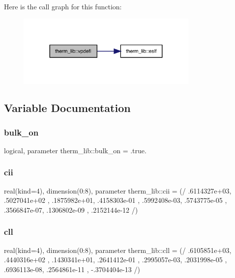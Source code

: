 Here is the call graph for this function\+:
\nopagebreak
\begin{figure}[H]
\begin{center}
\leavevmode
\includegraphics[width=251pt]{namespacetherm__lib_a6f84a6e1d410eb7f89dd59a9f6a13f3b_cgraph}
\end{center}
\end{figure}


\subsection{Variable Documentation}
\mbox{\label{namespacetherm__lib_a74e34c886f54fe2ca038c4f301d31beb}} 
\subsubsection{\texorpdfstring{bulk\+\_\+on}{bulk\_on}}
{\footnotesize\ttfamily logical, parameter therm\+\_\+lib\+::bulk\+\_\+on = .true.}

\mbox{\label{namespacetherm__lib_a80e96618552a9428c5819e0f9fcbc242}} 
\subsubsection{\texorpdfstring{cii}{cii}}
{\footnotesize\ttfamily real(kind=4), dimension(0\+:8), parameter therm\+\_\+lib\+::cii = (/ .\+6114327e+03, .\+5027041e+02 , .\+1875982e+01, .\+4158303e-\/01 , .\+5992408e-\/03, .\+5743775e-\/05 , .\+3566847e-\/07, .\+1306802e-\/09 , .\+2152144e-\/12 /)}

\mbox{\label{namespacetherm__lib_a0fd2184c73856d805e115f4a13068150}} 
\subsubsection{\texorpdfstring{cll}{cll}}
{\footnotesize\ttfamily real(kind=4), dimension(0\+:8), parameter therm\+\_\+lib\+::cll = (/ .\+6105851e+03, .\+4440316e+02 , .\+1430341e+01, .\+2641412e-\/01 , .\+2995057e-\/03, .\+2031998e-\/05 , .\+6936113e-\/08, .\+2564861e-\/11 , -\/.\+3704404e-\/13 /)}


